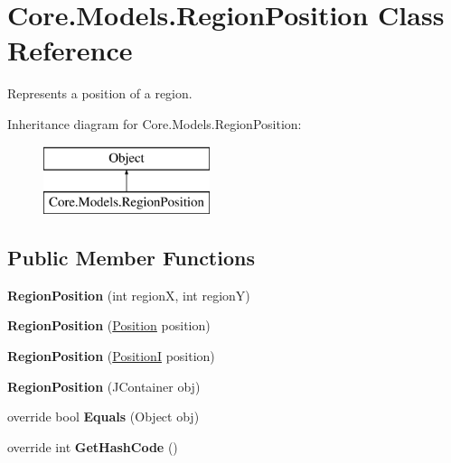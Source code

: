 \hypertarget{classCore_1_1Models_1_1RegionPosition}{\section{Core.\-Models.\-Region\-Position Class Reference}
\label{classCore_1_1Models_1_1RegionPosition}
}


Represents a position of a region.  


Inheritance diagram for Core.\-Models.\-Region\-Position\-:\begin{figure}[H]
\begin{center}
\leavevmode
\includegraphics[height=2.000000cm]{classCore_1_1Models_1_1RegionPosition}
\end{center}
\end{figure}
\subsection*{Public Member Functions}
\begin{DoxyCompactItemize}
\item 
\hypertarget{classCore_1_1Models_1_1RegionPosition_ae02aba3016ef1e1eca5b3283bbd6068b}{{\bfseries Region\-Position} (int region\-X, int region\-Y)}\label{classCore_1_1Models_1_1RegionPosition_ae02aba3016ef1e1eca5b3283bbd6068b}

\item 
\hypertarget{classCore_1_1Models_1_1RegionPosition_a79f52954eeec48c9a5b06fd0a6ec9053}{{\bfseries Region\-Position} (\hyperlink{classCore_1_1Models_1_1Position}{Position} position)}\label{classCore_1_1Models_1_1RegionPosition_a79f52954eeec48c9a5b06fd0a6ec9053}

\item 
\hypertarget{classCore_1_1Models_1_1RegionPosition_a09edc96dddc599eedf2980effb36956a}{{\bfseries Region\-Position} (\hyperlink{classCore_1_1Models_1_1PositionI}{Position\-I} position)}\label{classCore_1_1Models_1_1RegionPosition_a09edc96dddc599eedf2980effb36956a}

\item 
\hypertarget{classCore_1_1Models_1_1RegionPosition_a120da8d2e0832f8a3c3b12f4e610d10c}{{\bfseries Region\-Position} (J\-Container obj)}\label{classCore_1_1Models_1_1RegionPosition_a120da8d2e0832f8a3c3b12f4e610d10c}

\item 
\hypertarget{classCore_1_1Models_1_1RegionPosition_a103e5d6c1fd5bc4ded06d98fb308bc63}{override bool {\bfseries Equals} (Object obj)}\label{classCore_1_1Models_1_1RegionPosition_a103e5d6c1fd5bc4ded06d98fb308bc63}

\item 
\hypertarget{classCore_1_1Models_1_1RegionPosition_ac39a779696243b79152ebde4f3029738}{override int {\bfseries Get\-Hash\-Code} ()}\label{classCore_1_1Models_1_1RegionPosition_ac39a779696243b79152ebde4f3029738}

\end{DoxyCompactItemize}
